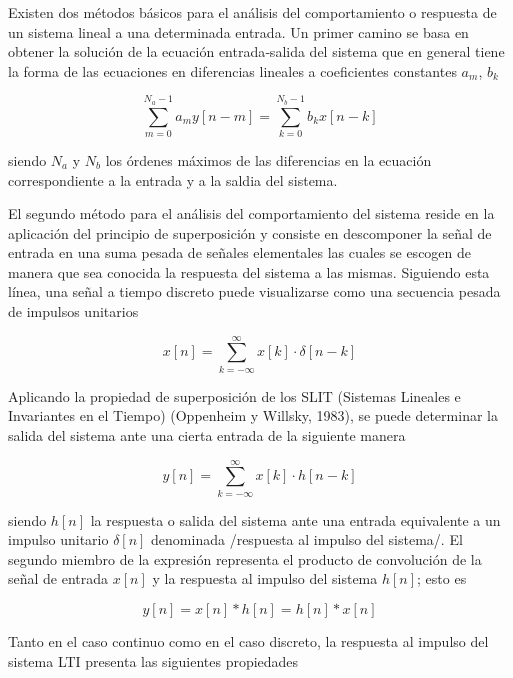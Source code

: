     Existen dos métodos básicos para el análisis del comportamiento o respuesta de un sistema lineal a una determinada entrada. Un primer camino se basa en obtener la solución de la ecuación entrada‐salida del sistema que en general tiene la forma de las ecuaciones en diferencias lineales a coeficientes constantes $a_{m}$, $b_k$

    \begin{equation}
      \sum_{m=0}^{N_a - 1}{a_m y[n-m]} = \sum_{k=0}^{N_b - 1}{b_k x[n-k]}
      \label{eq:defFiltro}
    \end{equation}

    siendo $N_a$ y $N_b$ los órdenes máximos de las diferencias en la ecuación correspondiente a la entrada y a la saldia del sistema.

    El segundo método para el análisis del comportamiento del sistema reside en la aplicación del principio de superposición y consiste en descomponer la señal de entrada en una suma pesada de señales elementales las cuales se escogen de manera que sea conocida la respuesta del sistema a las mismas. Siguiendo esta línea, una señal a tiempo discreto puede visualizarse como una secuencia pesada de impulsos unitarios

    \begin{equation}
      x[n] = \sum_{k=-\infty}^{\infty}{x[k] \cdot \delta [n - k] }
    \end{equation}

    Aplicando la propiedad de superposición de los SLIT (Sistemas Lineales e Invariantes en el Tiempo) (Oppenheim y Willsky, 1983), se puede determinar la salida del sistema ante una cierta entrada de la siguiente manera

    \begin{equation}
      y[n] = \sum_{k=-\infty}^{\infty}{x[k] \cdot h[n-k]}
    \end{equation}

    siendo $h[n]$ la respuesta o salida del sistema ante una entrada equivalente a un impulso unitario $\delta [n]$ denominada /respuesta al impulso del sistema/. El segundo miembro de la expresión representa el producto de convolución de la señal de entrada $x[n]$ y la respuesta al impulso del sistema $h[n]$; esto es

    \begin{equation}
      y[n] = x[n] * h[n] = h[n] * x[n]
    \end{equation}

    Tanto en el caso continuo como en el caso discreto, la respuesta al impulso del sistema LTI presenta las siguientes propiedades

